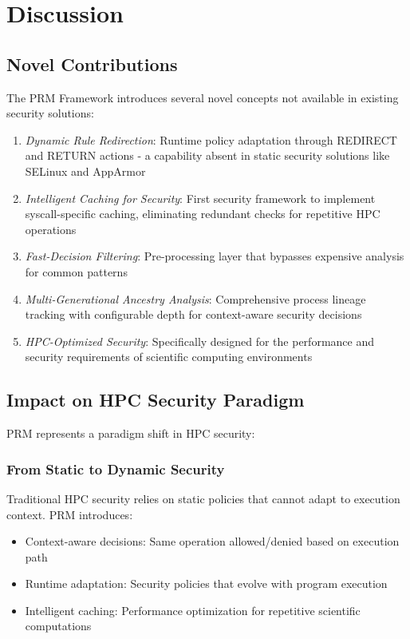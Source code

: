 \documentclass[conference]{IEEEtran}
\begin{document}
\section{Discussion}
\label{sec:discussion}

\subsection{Novel Contributions}
The PRM Framework introduces several novel concepts not available in existing security solutions:

\begin{enumerate}
\item \emph{Dynamic Rule Redirection}: Runtime policy adaptation through REDIRECT and RETURN actions - a capability absent in static security solutions like SELinux and AppArmor
\item \emph{Intelligent Caching for Security}: First security framework to implement syscall-specific caching, eliminating redundant checks for repetitive HPC operations
\item \emph{Fast-Decision Filtering}: Pre-processing layer that bypasses expensive analysis for common patterns
\item \emph{Multi-Generational Ancestry Analysis}: Comprehensive process lineage tracking with configurable depth for context-aware security decisions
\item \emph{HPC-Optimized Security}: Specifically designed for the performance and security requirements of scientific computing environments
\end{enumerate}

\subsection{Impact on HPC Security Paradigm}
PRM represents a paradigm shift in HPC security:

\subsubsection{From Static to Dynamic Security}
Traditional HPC security relies on static policies that cannot adapt to execution context. PRM introduces:
\begin{itemize}
\item Context-aware decisions: Same operation allowed/denied based on execution path
\item Runtime adaptation: Security policies that evolve with program execution
\item Intelligent caching: Performance optimization for repetitive scientific computations
\end{itemize}
\end{document}
